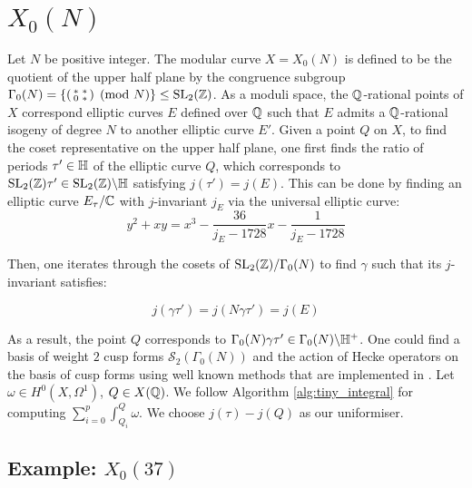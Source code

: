 \section{$X_0(N)$}\label{sec:X_0_N}

Let $N$ be positive integer. The modular curve $X = X_0(N)$ is defined to be the quotient of the upper half plane by the congruence subgroup $\Gamma_0(N) = \{ \begin{psmallmatrix} \ast & \ast \\ 0 & \ast \end{psmallmatrix} \pmod{N} \} \leq \operatorname{SL}_2(\mathbb{Z})$. As a moduli space, the $\mathbb{Q}$-rational points of $X$ correspond elliptic curves $E$ defined over $\mathbb{Q}$ such that $E$ admits a $\mathbb{Q}$-rational isogeny of degree $N$ to another elliptic curve $E'$. Given a point $Q$ on $X$, to find the coset representative on the upper half plane, one first finds the ratio of periods $\tau' \in \mathbb{H}$ of the elliptic curve $Q$, which corresponds to $\operatorname{SL}_2(\mathbb{Z}) \tau' \in \operatorname{SL}_2(\mathbb{Z})\backslash \mathbb{H}$ satisfying $j(\tau') = j(E)$. This can be done by finding an elliptic curve $E_{\tau}/\mathbb{C}$ with $j$-invariant $j_E$ via the universal elliptic curve: \[
y^2 + xy = x^3 - \frac{36}{j_E -1728}x - \frac{1}{j_E - 1728}
\]

Then, one iterates through the cosets of $\operatorname{SL}_2(\mathbb{Z})/\Gamma_0(N)$ to find $\gamma$ such that its $j$-invariant satisfies:

\[
j(\gamma \tau') = j( N\gamma \tau') = j(E)
\]

As a result, the point $Q$ corresponds to $\Gamma_0(N) \gamma \tau' \in \Gamma_0(N) \backslash \mathbb{H}^+$. One could find a basis of weight $2$ cusp forms $\mathcal{S}_2(\Gamma_0(N))$ and the action of Hecke operators on the basis of cusp forms using well known methods that are implemented in \SageMath \cite{steinmf,sagemath}. Let $\omega \in H^0(X,\Omega^1)$, $Q \in X(\mathbb{Q})$. We follow Algorithm \ref{alg:tiny_integral} for computing $\sum_{i=0}^{p}\int^Q_{Q_i} \omega$. We choose $j(\tau)-j(Q)$ as our uniformiser.

\subsection{Example: $X_0(37)$}

